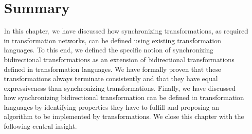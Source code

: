 \section{Summary}


In this chapter, we have discussed how synchronizing transformations, as required in transformation networks, can be defined using existing transformation languages.
To this end, we defined the specific notion of synchronizing bidirectional transformations as an extension of bidirectional transformations defined in transformation languages.
We have formally proven that these transformations always terminate consistently and that they have equal expressiveness than synchronizing transformations.
Finally, we have discussed how synchronizing bidirectional transformation can be defined in transformation languages by identifying properties they have to fulfill and proposing an algorithm to be implemented by transformations.
We close this chapter with the following central insight.

